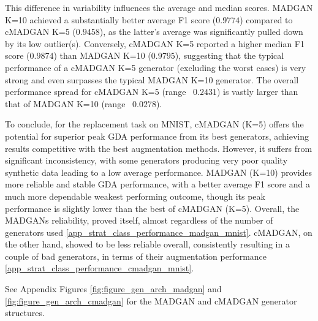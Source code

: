 This difference in variability influences the average and median scores. MADGAN K=10 achieved a substantially better average F1 score ($0.9774$) compared to cMADGAN K=5 ($0.9458$), as the latter's average was significantly pulled down by its low outlier(s). Conversely, cMADGAN K=5 reported a higher median F1 score ($0.9874$) than MADGAN K=10 ($0.9795$), suggesting that the typical performance of a cMADGAN K=5 generator (excluding the worst cases) is very strong and even surpasses the typical MADGAN K=10 generator. The overall performance spread for cMADGAN K=5 (range ~$0.2431$) is vastly larger than that of MADGAN K=10 (range ~$0.0278$).

To conclude, for the replacement task on MNIST, cMADGAN (K=5) offers the potential for superior peak GDA performance from its best generators, achieving results competitive with the best augmentation methods. However, it suffers from significant inconsistency, with some generators producing very poor quality synthetic data leading to a low average performance. MADGAN (K=10) provides more reliable and stable GDA performance, with a better average F1 score and a much more dependable weakest performing outcome, though its peak performance is slightly lower than the best of cMADGAN (K=5). Overall, the MADGANs reliability, proved itself, almost regardless of the number of generators used \ref{app_strat_class_performance_madgan_mnist}. cMADGAN, on the other hand, showed to be less reliable overall, consistently resulting in a couple of bad generators, in terms of their augmentation performance \ref{app_strat_class_performance_cmadgan_mnist}.

See Appendix Figures \ref{fig:figure_gen_arch_madgan} and \ref{fig:figure_gen_arch_cmadgan} for the MADGAN and cMADGAN generator structures.


